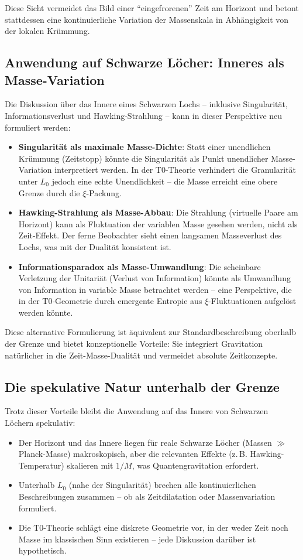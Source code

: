 Diese Sicht vermeidet das Bild einer ``eingefrorenen'' Zeit am Horizont und betont stattdessen eine kontinuierliche Variation der Massenskala in Abhängigkeit von der lokalen Krümmung.

\subsection{Anwendung auf Schwarze Löcher: Inneres als Masse-Variation}

Die Diskussion über das Innere eines Schwarzen Lochs – inklusive Singularität, Informationsverlust und Hawking-Strahlung – kann in dieser Perspektive neu formuliert werden:
\begin{itemize}
	\item \textbf{Singularität als maximale Masse-Dichte}: Statt einer unendlichen Krümmung (Zeitstopp) könnte die Singularität als Punkt unendlicher Masse-Variation interpretiert werden. In der T0-Theorie verhindert die Granularität unter \(L_0\) jedoch eine echte Unendlichkeit – die Masse erreicht eine obere Grenze durch die \(\xi\)-Packung.
	\item \textbf{Hawking-Strahlung als Masse-Abbau}: Die Strahlung (virtuelle Paare am Horizont) kann als Fluktuation der variablen Masse gesehen werden, nicht als Zeit-Effekt. Der ferne Beobachter sieht einen langsamen Masseverlust des Lochs, was mit der Dualität konsistent ist.
	\item \textbf{Informationsparadox als Masse-Umwandlung}: Die scheinbare Verletzung der Unitariät (Verlust von Information) könnte als Umwandlung von Information in variable Masse betrachtet werden – eine Perspektive, die in der T0-Geometrie durch emergente Entropie aus \(\xi\)-Fluktuationen aufgelöst werden könnte.
\end{itemize}

Diese alternative Formulierung ist äquivalent zur Standardbeschreibung oberhalb der Grenze und bietet konzeptionelle Vorteile: Sie integriert Gravitation natürlicher in die Zeit-Masse-Dualität und vermeidet absolute Zeitkonzepte.

\subsection{Die spekulative Natur unterhalb der Grenze}

Trotz dieser Vorteile bleibt die Anwendung auf das Innere von Schwarzen Löchern spekulativ:
\begin{itemize}
	\item Der Horizont und das Innere liegen für reale Schwarze Löcher (Massen \(\gg\) Planck-Masse) makroskopisch, aber die relevanten Effekte (z.\,B. Hawking-Temperatur) skalieren mit \(1/M\), was Quantengravitation erfordert.
	\item Unterhalb \(L_0\) (nahe der Singularität) brechen alle kontinuierlichen Beschreibungen zusammen – ob als Zeitdilatation oder Massenvariation formuliert.
	\item Die T0-Theorie schlägt eine diskrete Geometrie vor, in der weder Zeit noch Masse im klassischen Sinn existieren – jede Diskussion darüber ist hypothetisch.
\end{itemize}

